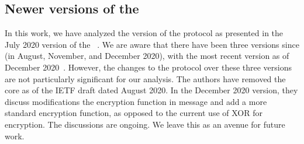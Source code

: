 \documentclass[runningheads, envcountsame, hidelinks, a4paper, draft, x11names]{llncs}
\begin{document}
\subsection{Newer versions of the \mSpec} \label{sec:newdrafts}
In this work, we have analyzed the version of the \mEdhoc{} protocol as
presented in the July 2020 version of the
\mSpec{}~\cite{our-analysis-selander-lake-edhoc-00}.
%
We are aware that there have been three versions since
(in August, November, and December 2020), with the most recent version as
of December 2020~\cite{latest-ietf-lake-edhoc-03}.
%
However, the changes to the protocol over these three versions are not
particularly significant for our analysis.
%
The authors have removed the \mPskPsk{} core as of the IETF draft dated August
2020.
%
In the December 2020 version, they discuss modifications the encryption
function in message \mMsgtwo{} and add a more standard encryption function,
as opposed to the current use of XOR for encryption.
%
The discussions are ongoing.
%
We leave this as an avenue for future work.\\

%
%






\appendix

\section{\mPsk}
\label{sec:appendixPsk}
\end{document}
